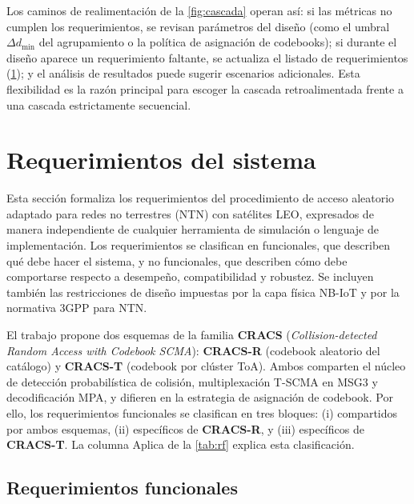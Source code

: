 Los caminos de realimentación de la \cref{fig:cascada} operan así: si las métricas no cumplen los requerimientos, se revisan parámetros del diseño (como el umbral $\Delta d_{\min}$ del agrupamiento o la política de asignación de codebooks); si durante el diseño aparece un requerimiento faltante, se actualiza el listado de requerimientos (\cref{sec:requerimientos}); y el análisis de resultados puede sugerir escenarios adicionales. Esta flexibilidad es la razón principal para escoger la cascada retroalimentada frente a una cascada estrictamente secuencial.


\section{Requerimientos del sistema}
\label{sec:requerimientos}
\label{ch:requerimientos}

Esta sección formaliza los requerimientos del procedimiento de acceso aleatorio adaptado para redes no terrestres (NTN) con satélites LEO, expresados de manera independiente de cualquier herramienta de simulación o lenguaje de implementación. Los requerimientos se clasifican en funcionales, que describen qué debe hacer el sistema, y no funcionales, que describen cómo debe comportarse respecto a desempeño, compatibilidad y robustez. Se incluyen también las restricciones de diseño impuestas por la capa física NB-IoT y por la normativa 3GPP para NTN.

El trabajo propone dos esquemas de la familia \textbf{CRACS} (\emph{Collision-detected Random Access with Codebook SCMA}): \textbf{CRACS-R} (codebook aleatorio del catálogo) y \textbf{CRACS-T} (codebook por clúster ToA). Ambos comparten el núcleo de detección probabilística de colisión, multiplexación T-SCMA en MSG3 y decodificación MPA, y difieren en la estrategia de asignación de codebook. Por ello, los requerimientos funcionales se clasifican en tres bloques: (i) compartidos por ambos esquemas, (ii) específicos de \textbf{CRACS-R}, y (iii) específicos de \textbf{CRACS-T}. La columna Aplica de la \cref{tab:rf} explica esta clasificación.

\subsection{Requerimientos funcionales}
\label{sec:rf}

